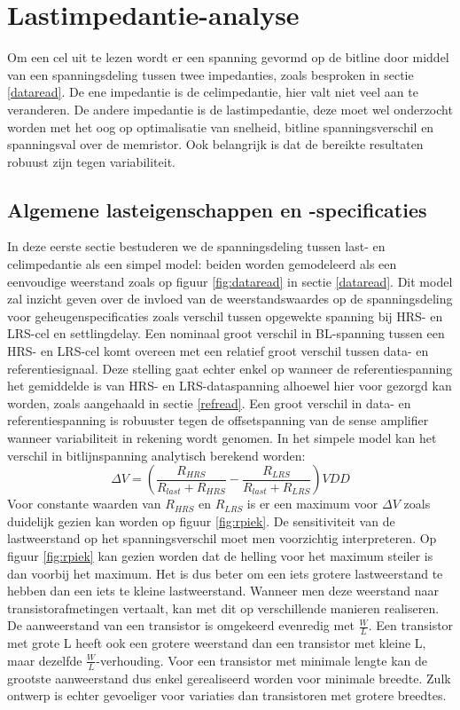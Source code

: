 \chapter{Lastimpedantie-analyse}
\label{loadanalysis}
Om een cel uit te lezen wordt er een spanning gevormd op de bitline door middel van een spanningsdeling tussen twee impedanties, zoals besproken in sectie \ref{dataread}. De ene impedantie is de celimpedantie, hier valt niet veel aan te veranderen. De andere impedantie is de lastimpedantie, deze moet wel onderzocht worden met het oog op optimalisatie van snelheid, bitline spanningsverschil en spanningsval over de memristor.
Ook belangrijk is dat de bereikte resultaten robuust zijn tegen variabiliteit.

\section{Algemene lasteigenschappen en -specificaties}\label{sec:simplemodel}
In deze eerste sectie bestuderen we de spanningsdeling tussen last- en celimpedantie als een simpel model: beiden worden gemodeleerd als een eenvoudige weerstand zoals op figuur \ref{fig:dataread} in sectie \ref{dataread}. Dit model zal inzicht geven over de invloed van de weerstandswaardes op de spanningsdeling voor geheugenspecificaties zoals verschil tussen opgewekte spanning bij HRS- en LRS-cel en settlingdelay.
Een nominaal groot verschil in BL-spanning tussen een HRS- en LRS-cel komt overeen met een relatief groot verschil tussen data- en referentiesignaal. Deze stelling gaat echter enkel op wanneer de referentiespanning het gemiddelde is van HRS- en LRS-dataspanning alhoewel hier voor gezorgd kan worden, zoals aangehaald in sectie \ref{refread}. Een groot verschil in data- en referentiespanning is robuuster tegen de offsetspanning van de sense amplifier wanneer variabiliteit in rekening wordt genomen. In het simpele model kan het verschil in bitlijnspanning analytisch berekend worden:
\begin{equation}
 \Delta V = (\frac{R_{HRS}}{R_{last}+R_{HRS}} - \frac{R_{LRS}}{R_{last}+R_{LRS}})VDD
\end{equation} 
Voor constante waarden van $R_{HRS}$ en $R_{LRS}$ is er een maximum voor $ \Delta V$ zoals duidelijk gezien kan worden op figuur \ref{fig:rpiek}. De sensitiviteit van de lastweerstand op het spanningsverschil moet men voorzichtig interpreteren. Op figuur \ref{fig:rpiek} kan gezien worden dat de helling voor het maximum steiler is dan voorbij het maximum. Het is dus beter om een iets grotere lastweerstand te hebben dan een iets te kleine lastweerstand. Wanneer men deze weerstand naar transistorafmetingen vertaalt, kan met dit op verschillende manieren realiseren. De aanweerstand van een transistor is omgekeerd evenredig met $\frac{W}{L}$. Een transistor met grote L heeft ook een grotere weerstand dan een transistor met kleine L, maar dezelfde $\frac{W}{L}$-verhouding. Voor een transistor met minimale lengte kan de grootste aanweerstand dus enkel gerealiseerd worden voor minimale breedte. Zulk ontwerp is echter gevoeliger voor variaties dan transistoren met grotere breedtes.\\
